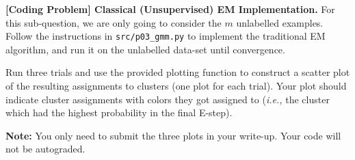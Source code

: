 \ifnum{} {
  \clearpage
} \fi
\item{}
\textbf{[Coding Problem] Classical (Unsupervised) EM Implementation.}
For this sub-question, we are only going to consider the $m$ unlabelled examples. Follow the instructions in \texttt{src/p03\_gmm.py} to implement the traditional EM algorithm, and run it on the unlabelled data-set until convergence.

Run three trials and use the provided plotting function to construct a scatter plot of the resulting assignments to clusters (one plot for each trial). Your plot should indicate cluster assignments with colors they got assigned to (\emph{i.e.,} the cluster which had the highest probability in the final E-step). 

\textbf{Note:} You only need to submit the three plots in your write-up. Your code will not be autograded.

\ifnum{} {
  
} \fi
